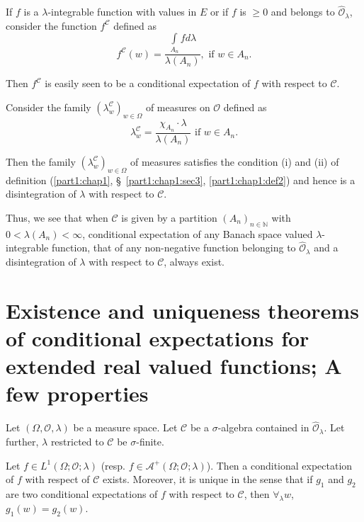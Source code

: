 If $f$ is a $\lambda$-integrable function with values in $E$ or if $f$
is $\geq 0$ and belongs to $\hat{\mathscr{O}}_\lambda$, consider the
function $f^\mathscr{C}$ defined as 
$$
f^\mathscr{C} (w) = \dfrac{\int\limits_{A_n} f d
  \lambda}{\lambda(A_n)}, \text{ if } w \in A_n. 
$$

Then $f^\mathscr{C}$ is easily seen to be a conditional expectation of
$f$ with respect to $\mathscr{C}$. 


Consider the family $(\lambda^\mathscr{C}_w)_{w \in \Omega}$ of
  measures on $\mathscr{O}$ defined as 
$$
\lambda^\mathscr{C}_w = \frac{\chi_{A_n} \cdot \lambda}{\lambda(A_n)}
\text{ if } w \in A_n . 
$$\pageoriginale

Then the family $(\lambda^\mathscr{C}_w)_{w \in \Omega}$ of measures
satisfies the condition (i) and (ii) of definition (\ref{part1:chap1},
\S\ \ref{part1:chap1:sec3}, \ref{part1:chap1:def2}) and 
hence is a disintegration of $\lambda$ with respect to $\mathscr{C}$. 

Thus, we see that when $\mathscr{C}$ is given by a partition $(A_n)_{n
\in \mathbb{N}}$ with $0 < \lambda(A_n) < \infty$, conditional
expectation of any Banach space valued $\lambda$-integrable function,
that of any non-negative function belonging to
$\hat{\mathscr{O}}_\lambda$ and a disintegration of $\lambda$ with
respect to $\mathscr{C}$, always exist. 

\section[Existence and uniqueness theorems of...]{Existence and uniqueness theorems of conditional expectations
for extended real valued functions; A few properties}\label{part1:chap1:sec5}


Let $(\Omega, \mathscr{O}, \lambda)$ be a measure space. Let
$\mathscr{C}$ be a $\sigma$-algebra contained in
$\hat{\mathscr{O}}_\lambda$. Let further, $\lambda$ restricted to
$\mathscr{C}$ be $\sigma$-finite. 

\begin{proposition}\label{part1:chap1:prop3}
Let $f \in L^1(\Omega; \mathscr{O}; \lambda)$ (resp. $f \in
\mathscr{A}^+ (\Omega ; \mathscr{O}; \lambda)$). Then a conditional
expectation of $f$ with respect of $\mathscr{C}$ exists. Moreover, it
is unique in the sense that if $g_1$ and $g_2$ are two conditional
expectations of $f$ with respect to $\mathscr{C}$, then
$\forall_\lambda w$, $g_1 (w) = g_2 (w)$. 
\end{proposition}

